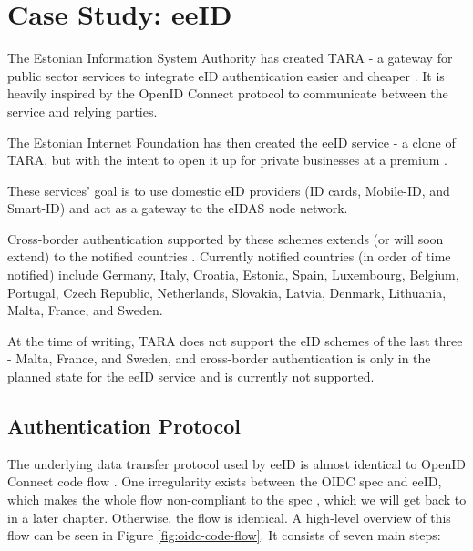 \section{Case Study: eeID}

The Estonian Information System Authority has created TARA - a gateway for public sector services to integrate eID authentication easier and cheaper \cite{tara-business}. It is heavily inspired by the OpenID Connect \cite{tara-technical} protocol to communicate between the service and relying parties.

The Estonian Internet Foundation has then created the eeID service - a clone of TARA, but with the intent to open it up for private businesses at a premium \cite{eeid}.

These services' goal is to use domestic eID providers (ID cards, Mobile-ID, and Smart-ID) and act as a gateway to the eIDAS node network.

Cross-border authentication supported by these schemes extends (or will soon extend) to the notified countries \cite{eulaw-eidas-notified}. Currently notified countries (in order of time notified) include Germany, Italy, Croatia, Estonia, Spain, Luxembourg, Belgium, Portugal, Czech Republic, Netherlands, Slovakia, Latvia, Denmark, Lithuania, Malta, France, and Sweden.

At the time of writing, TARA does not support the eID schemes of the last three - Malta, France, and Sweden, and cross-border authentication is only in the planned state for the eeID service and is currently not supported.

\subsection{Authentication Protocol}

The underlying data transfer protocol used by eeID is almost identical to OpenID Connect code flow \cite{tara-technical, oidc}. One irregularity exists between the OIDC spec and eeID, which makes the whole flow non-compliant to the spec \cite{tara-non-oidc-compliant}, which we will get back to in a later chapter. Otherwise, the flow is identical. A high-level overview of this flow can be seen in Figure \ref{fig:oidc-code-flow}. It consists of seven main steps:

